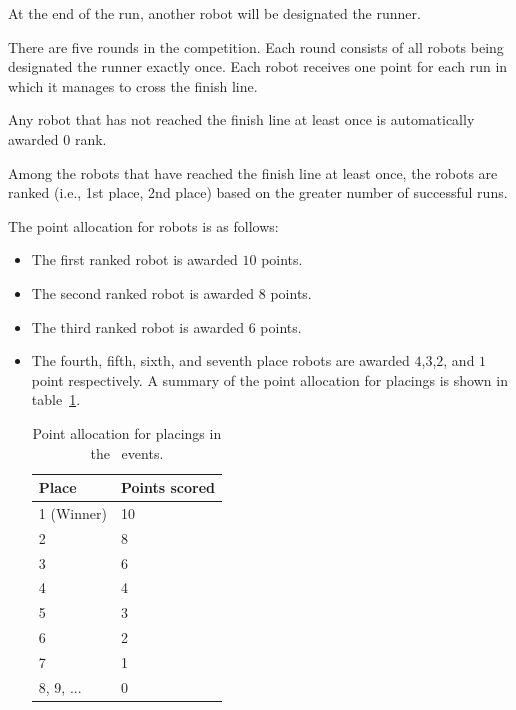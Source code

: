 \documentclass[12pt]{hurocup}
\begin{document}

\begin{lawlist}[OR]
\item At the end of the run, another robot will be designated the
  runner.
\item There are five rounds in the competition. Each round consists of
  all robots being designated the runner exactly once. Each robot
  receives one point for each run in which it manages to cross the
  finish line.
\item Any robot that has not reached the finish line at least once is automatically
  awarded 0 rank.
\item Among the robots that have reached the finish line at least
  once, the robots are ranked (i.e., 1st place, 2nd place) based on
  the greater number of successful runs.

\item The point allocation for robots is as follows:
  \begin{itemize}
  \item The first ranked robot is awarded $10$ points.
  \item The second ranked robot is awarded $8$ points.
  \item The third ranked robot is awarded $6$ points.
  \item The fourth, fifth, sixth, and seventh place robots are awarded
    $4$,$3$,$2$, and $1$ point respectively.  A summary of the point
    allocation for placings is shown in table~\ref{point-allocation}.

    \begin{table}
      \begin{center}
        \begin{tabular}{l|l}
          \hline
          Place & Points scored \\
          \hline
          1 (Winner) & 10 \\
          2          & 8 \\
          3          & 6 \\
          4          & 4 \\
          5          & 3 \\
          6          & 2 \\
          7          & 1 \\
          8, 9, ...  & 0 \\
          \hline
        \end{tabular}
      \end{center}
      \caption{Point allocation for placings in the \HuroCup\ events.}
      \label{point-allocation}
    \end{table}
  \end{itemize}


\end{lawlist}
\end{document}

